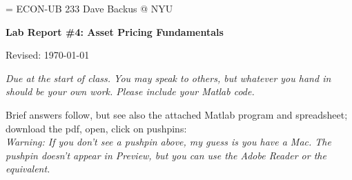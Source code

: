 \documentclass[11pt]{exam}
\begin{document}
\parskip=\bigskipamount
\parindent=0.0in
\thispagestyle{empty}
{\large ECON-UB 233 \hfill Dave Backus @ NYU}

\bigskip\bigskip
\centerline{\Large \bf Lab Report \#4: Asset Pricing Fundamentals}
\centerline{Revised: \today}

\bigskip
{\it Due at the start of class.
You may speak to others, but whatever you hand in should be your own work.
Please include your Matlab code.}

\begin{solution}
Brief answers follow,
but see also the attached Matlab program and spreadsheet;
download the pdf, open, click on pushpins:
 \\
{\it Warning:  If you don't see a pushpin above, my guess is you have a Mac.
The pushpin doesn't appear in Preview,
but you can use the Adobe Reader or the equivalent.}
\end{solution}
\end{document}
